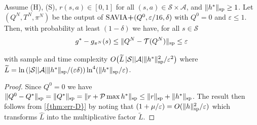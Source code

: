 \documentclass{article}
\newcommand{\Roberto}[1]{\todo[color=blue!20,author=\textbf{\small Roberto},inline]{\small #1}}
\newcommand{\cA}{\mathcal{A}}
\newcommand{\cS}{\mathcal{S}}
\newcommand{\cP}{\mathcal{P} }
\newcommand{\T}{\mathcal{T}}
\renewcommand{\sp}[1]{\|{#1}\|_\text{\rm sp}}
\newcommand{\R}{r}
\newenvironment{manualcorollary}[1]{%
    \renewcommand\themanualcorollaryinner{#1}%
  \manualcorollaryinner
}{\endmanualtheoreminner}
\theoremstyle{plain}
\theoremstyle{definition}
\theoremstyle{remark}
\begin{document}

\vspace{1ex}
\begin{manualcorollary}{\ref{cor:err}}
Assume \mbox{\sc (H)}, \mbox{\sc (S)}, $r(s,a) \in[0,1]$ for all $(s,a)\in\cS\times\cA$, and $\sp{h^{*}}\ge 1$. Let $(Q^N,T^N,\pi^N)$ be the output of $\mbox{\rm SAVIA\textbf{+}}(Q^0,\varepsilon/16,\delta)$
with $Q^0=0$ and $\varepsilon\leq 1$. Then, with probability at least $(1-\delta)$ we have,  for all $s\in\cS$
\vspace{-1ex}
  $$g^*-g_{\pi^N}(s)\leq \sp{Q^N-\T(Q^N)} \leq \varepsilon$$
 
  \vspace{-2ex}
   with sample and time complexity ${O}\big(\widetilde{L}\,|\cS||\cA|\sp{h^*}^{2}/\varepsilon^{2}\big)$
   where $\widetilde{L}= \ln \left(|\cS||\cA|\sp{h^*}/(\varepsilon \delta)\right)\ln^4 (\sp{h^*}/\varepsilon)$.
\end{manualcorollary}
\begin{proof}
Since $Q^0=0$ we have $\sp{Q^0-Q^*}=\sp{Q^*}=\sp{\R+\cP\max h^*}\leq\sp{\R}+\sp{h^*}$.  The result then follows from \cref{{thm:err-D}} by noting that $(1+\mu/\varepsilon)=O(\sp{h}^2/\varepsilon)$ which transforms $\widehat{L}$ into the multiplicative factor 
 $\widetilde{L}$.
\end{proof}
\end{document}
